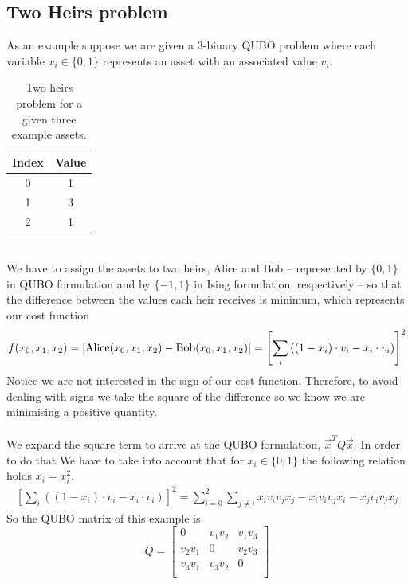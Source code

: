 \subsection{Two Heirs problem}
 As an example suppose we are given a 3-binary QUBO problem where each variable $x_{i} \in \{0,1\}$ represents an asset with an associated value $v_{i}$.\\
\begin{table}[h]
\label{tab:Assets}
\centering
\begin{tabular}{ c | c }
  \hline			
  Index & Value  \\
    \hline		
   0 & 1\\
       \hline		
   1 & 3\\
       \hline		
   2 & 1
\end{tabular}
\caption{Two heirs problem for a given three example assets.}
\end{table}
\\
We have to assign the assets to two heirs, Alice and Bob -- represented by $\{0,1\}$ in QUBO formulation and by $\{-1,1\}$ in Ising formulation, respectively -- so that the difference between the values each heir receives is minimum, which represents our cost function
\begin{equation}
    f(x_{0}, x_{1}, x_{2}) = \abs{\text{Alice}(x_{0}, x_{1}, x_{2}) - \text{Bob}(x_{0}, x_{1}, x_{2})} = \left[\sum_{i}\left((1-x_{i})\cdot v_{i} - x_{i}\cdot v_{i}\right)\right]^{2}
\end{equation}
Notice we are not interested in the sign of our cost function. Therefore, to avoid dealing with signs we take the square of the difference so we know we are minimising a positive quantity.\\\\
We expand the square term to arrive at the QUBO formulation, $\vec{x}^{T}Q\vec{x}$. In order to do that We have to take into account that for $x_{i} \in \{0,1\}$ the following relation holds $x_{i}=x_{i}^{2}$. 
\begin{align}
    \left[\sum_{i}\left((1-x_{i})\cdot v_{i} - x_{i}\cdot v_{i}\right)\right]^{2} = \sum_{i=0}^{2}\sum_{j\neq i}x_{i}v_{i}v_{j}x_{j} - x_{i}v_{i}v_{j}x_{i} - x_{j}v_{i}v_{j}x_{j}
\end{align}
So the QUBO matrix of this example is
\begin{equation}
Q= 
    \begin{bmatrix}
           0 & v_{1}v_{2} & v_{1}v_{3}\\
           v_{2}v_{1} & 0 & v_{2}v_{3}\\
           v_{3}v_{1}& v_{3}v_{2} & 0\\
         \end{bmatrix}
\end{equation}
